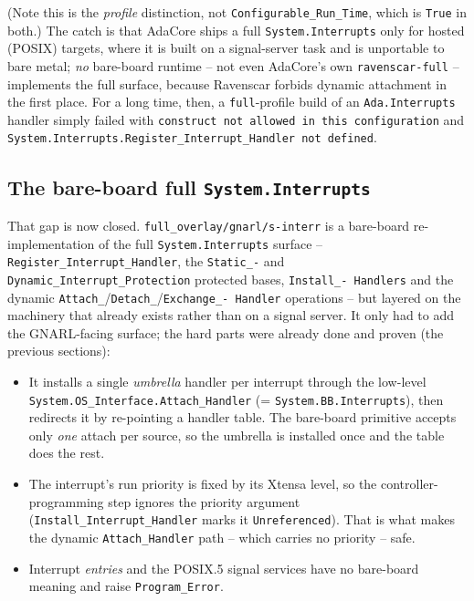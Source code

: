 (Note this is the \emph{profile} distinction, not \texttt{Configurable\_Run\_Time},
which is \texttt{True} in both.) The catch is that AdaCore ships a full
\texttt{System.Interrupts} only for hosted (POSIX) targets, where it is built on
a signal-server task and is unportable to bare metal; \emph{no} bare-board
runtime -- not even AdaCore's own \texttt{ravenscar-full} -- implements the
full surface, because Ravenscar forbids dynamic attachment in the first place.
For a long time, then, a \texttt{full}-profile build of an \texttt{Ada.Interrupts}
handler simply failed with \texttt{construct not allowed in this configuration}
and \texttt{System.Interrupts.Register\_Interrupt\_Handler not defined}.

\subsection{The bare-board full \texttt{System.Interrupts}}

That gap is now closed. \texttt{full\_overlay/gnarl/s-interr}
is a bare-board re-implementation of the full \texttt{System.Interrupts}
surface -- \texttt{Register\_Interrupt\_Handler}, the \texttt{Static\_-} and
\texttt{Dynamic\_Interrupt\_Protection} protected bases, \texttt{Install\_-
Handlers} and the dynamic \texttt{Attach\_}/\texttt{Detach\_}/\texttt{Exchange\_-
Handler} operations -- but layered on the machinery that already exists rather
than on a signal server. It only had to add the GNARL-facing surface; the hard
parts were already done and proven (the previous sections):

\begin{itemize}
  \item It installs a single \emph{umbrella} handler per interrupt through the
        low-level \texttt{System.OS\_Interface.Attach\_Handler}
        (= \texttt{System.BB.Interrupts}), then redirects it by re-pointing a
        handler table. The bare-board primitive accepts only \emph{one} attach
        per source, so the umbrella is installed once and the table does the rest.
  \item The interrupt's run priority is fixed by its Xtensa level, so the
        controller-programming step ignores the priority argument
        (\texttt{Install\_Interrupt\_Handler} marks it \texttt{Unreferenced}).
        That is what makes the dynamic \texttt{Attach\_Handler} path -- which
        carries no priority -- safe.
  \item Interrupt \emph{entries} and the POSIX.5 signal services have no
        bare-board meaning and raise \texttt{Program\_Error}.
\end{itemize}

